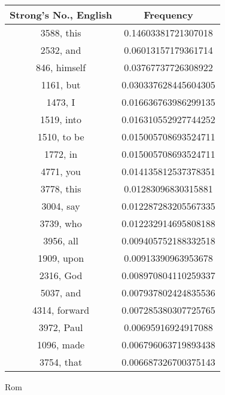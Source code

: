 \documentclass[12pt,letterpaper]{article}
\begin{document}
 \begin{longtable}{|c|c|}
\hline
 Strong's No., English & Frequency \\ \hline  
3588, this & 0.14603381721307018\\ \hline 
 2532, and & 0.06013157179361714\\ \hline 
 846, himself & 0.03767737726308922\\ \hline 
 1161, but & 0.030337628445604305\\ \hline 
 1473, I & 0.016636763986299135\\ \hline 
 1519, into & 0.016310552927744252\\ \hline 
 1510, to be & 0.015005708693524711\\ \hline 
 1772, in & 0.015005708693524711\\ \hline 
 4771, you & 0.014135812537378351\\ \hline 
 3778, this & 0.01283096830315881\\ \hline 
 3004, say & 0.012287283205567335\\ \hline 
 3739, who & 0.012232914695808188\\ \hline 
 3956, all & 0.009405752188332518\\ \hline 
 1909, upon & 0.00913390963953678\\ \hline 
 2316, God & 0.008970804110259337\\ \hline 
 5037, and & 0.007937802424835536\\ \hline 
 4314, forward & 0.007285380307725765\\ \hline 
 3972, Paul & 0.00695916924917088\\ \hline 
 1096, made & 0.006796063719893438\\ \hline 
 3754, that & 0.006687326700375143\\ \hline 
\end{longtable} 
 

Rom
\end{document}
